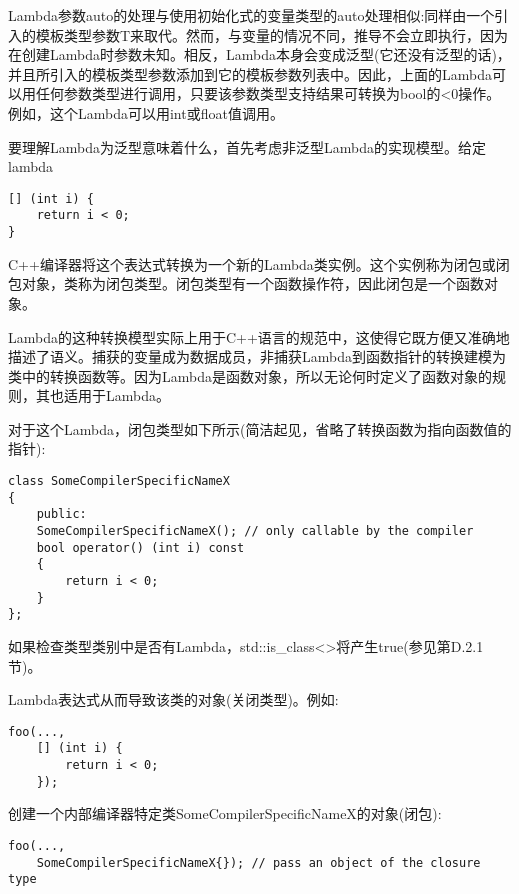 Lambda参数auto的处理与使用初始化式的变量类型的auto处理相似:同样由一个引入的模板类型参数T来取代。然而，与变量的情况不同，推导不会立即执行，因为在创建Lambda时参数未知。相反，Lambda本身会变成泛型(它还没有泛型的话)，并且所引入的模板类型参数添加到它的模板参数列表中。因此，上面的Lambda可以用任何参数类型进行调用，只要该参数类型支持结果可转换为bool的<0操作。例如，这个Lambda可以用int或float值调用。

要理解Lambda为泛型意味着什么，首先考虑非泛型Lambda的实现模型。给定lambda

\begin{lstlisting}[style=styleCXX]
[] (int i) {
	return i < 0;
}
\end{lstlisting}

C++编译器将这个表达式转换为一个新的Lambda类实例。这个实例称为闭包或闭包对象，类称为闭包类型。闭包类型有一个函数操作符，因此闭包是一个函数对象。

\begin{tcolorbox}[colback=webgreen!5!white,colframe=webgreen!75!black]
\hspace*{0.75cm}Lambda的这种转换模型实际上用于C++语言的规范中，这使得它既方便又准确地描述了语义。捕获的变量成为数据成员，非捕获Lambda到函数指针的转换建模为类中的转换函数等。因为Lambda是函数对象，所以无论何时定义了函数对象的规则，其也适用于Lambda。
\end{tcolorbox}

对于这个Lambda，闭包类型如下所示(简洁起见，省略了转换函数为指向函数值的指针):

\begin{lstlisting}[style=styleCXX]
class SomeCompilerSpecificNameX
{
	public:
	SomeCompilerSpecificNameX(); // only callable by the compiler
	bool operator() (int i) const
	{
		return i < 0;
	}
};
\end{lstlisting}

如果检查类型类别中是否有Lambda，std::is\_class<>将产生true(参见第D.2.1节)。

Lambda表达式从而导致该类的对象(关闭类型)。例如:

\begin{lstlisting}[style=styleCXX]
foo(...,
	[] (int i) {
		return i < 0;
	});
\end{lstlisting}

创建一个内部编译器特定类SomeCompilerSpecificNameX的对象(闭包):

\begin{lstlisting}[style=styleCXX]
foo(...,
	SomeCompilerSpecificNameX{}); // pass an object of the closure type
\end{lstlisting}

